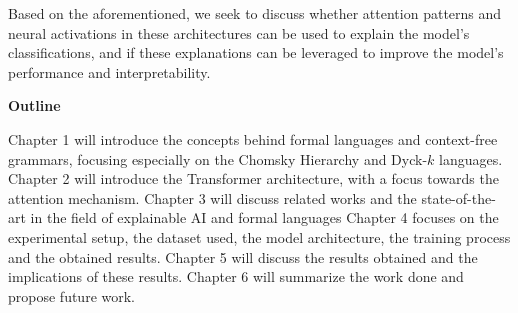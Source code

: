 Based on the aforementioned, we seek to discuss whether attention patterns and neural activations in these architectures can be used to explain the model's classifications, and if these explanations can be leveraged to improve the model's performance and interpretability.

\bigskip

\textbf{Outline}

Chapter 1 will introduce the concepts behind formal languages and context-free grammars, focusing especially on the Chomsky Hierarchy and Dyck-$k$ languages.
Chapter 2 will introduce the Transformer architecture, with a focus towards the attention mechanism.
Chapter 3 will discuss related works and the state-of-the-art in the field of explainable AI and formal languages
Chapter 4 focuses on the experimental setup, the dataset used, the model architecture, the training process and the obtained results.
Chapter 5 will discuss the results obtained and the implications of these results.
Chapter 6 will summarize the work done and propose future work.